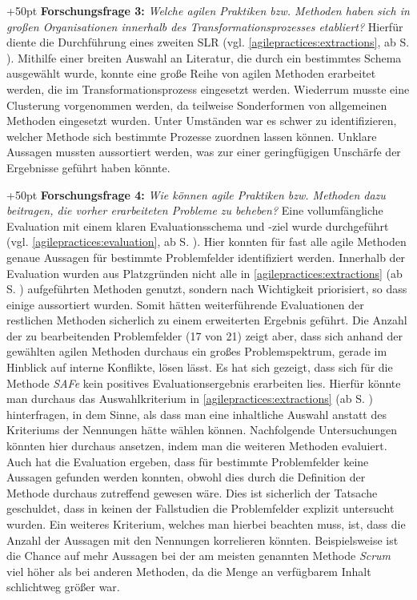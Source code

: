 \hangindent+50pt 
\textbf{Forschungsfrage 3:} \textit{Welche agilen Praktiken bzw. Methoden haben sich in großen Organisationen innerhalb des Transformationsprozesses etabliert?
} Hierfür diente die Durchführung eines zweiten SLR (vgl. \ref{agilepractices:extractions}, ab S. \pageref{agilepractices:extractions}). Mithilfe einer breiten Auswahl an Literatur, die durch ein bestimmtes Schema ausgewählt wurde, konnte eine große Reihe von agilen Methoden erarbeitet werden, die im Transformationsprozess eingesetzt werden. Wiederrum musste eine Clusterung vorgenommen werden, da teilweise Sonderformen von allgemeinen Methoden eingesetzt wurden. Unter Umständen war es schwer zu identifizieren, welcher Methode sich bestimmte Prozesse zuordnen lassen können. Unklare Aussagen mussten aussortiert werden, was zur einer geringfügigen Unschärfe der Ergebnisse geführt haben könnte.

\hangindent+50pt 
\textbf{Forschungsfrage 4:} \textit{Wie können agile Praktiken bzw. Methoden dazu beitragen, die vorher erarbeiteten Probleme zu beheben?} Eine vollumfängliche Evaluation mit einem klaren Evaluationsschema und -ziel wurde durchgeführt (vgl. \ref{agilepractices:evaluation}, ab S. \pageref{agilepractices:evaluation}). Hier konnten für fast alle agile Methoden genaue Aussagen für bestimmte Problemfelder identifiziert werden. Innerhalb der Evaluation wurden aus Platzgründen nicht alle in \ref{agilepractices:extractions} (ab S. \pageref{agilepractices:extractions}) aufgeführten Methoden genutzt, sondern nach Wichtigkeit priorisiert, so dass einige aussortiert wurden. Somit hätten weiterführende Evaluationen der restlichen Methoden sicherlich zu einem erweiterten Ergebnis geführt. Die Anzahl der zu bearbeitenden Problemfelder (17 von 21) zeigt aber, dass sich anhand der gewählten agilen Methoden durchaus ein großes Problemspektrum, gerade im Hinblick auf interne Konflikte, lösen lässt. Es hat sich gezeigt, dass sich für die Methode \textit{SAFe} kein positives Evaluationsergebnis erarbeiten lies. Hierfür könnte man durchaus das Auswahlkriterium in \ref{agilepractices:extractions} (ab S. \pageref{agilepractices:extractions}) hinterfragen, in dem Sinne, als dass man eine inhaltliche Auswahl anstatt des Kriteriums der Nennungen hätte wählen können. Nachfolgende Untersuchungen könnten hier durchaus ansetzen, indem man die weiteren Methoden evaluiert. Auch hat die Evaluation ergeben, dass für bestimmte Problemfelder keine Aussagen gefunden werden konnten, obwohl dies durch die Definition der Methode durchaus zutreffend gewesen wäre. Dies ist sicherlich der Tatsache geschuldet, dass in keinen der Fallstudien die Problemfelder explizit untersucht wurden. Ein weiteres Kriterium, welches man hierbei beachten muss, ist, dass die Anzahl der Aussagen mit den Nennungen korrelieren könnten. Beispielsweise ist die Chance auf mehr Aussagen bei der am meisten genannten Methode  \textit{Scrum} viel höher als bei anderen Methoden, da die Menge an verfügbarem Inhalt schlichtweg größer war. 

